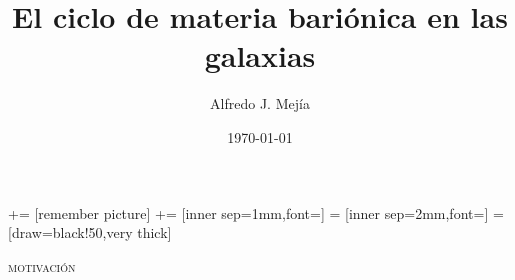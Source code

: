 \documentclass[xcolor=dvipsnames,4pt,hyperref={colorlinks,citecolor=black,linkcolor=black,urlcolor=black}]{beamer}
\begin{document}
\footnotesize
{}+= [remember picture]
 += [inner sep=1mm,font=\footnotesize]
 = [inner sep=2mm,font={\scshape\footnotesize}]
 = [draw=black!50,very thick]

\begin{frame}
\title{El ciclo de materia bariónica en las galaxias}
\author{Alfredo J. Mej\'ia}
\date{\today}

\maketitle
\end{frame}

\begin{frame}{\textsc{motivación}}

\begin{tikzpicture}[overlay]


\end{tikzpicture}
\end{frame}
\end{document}
